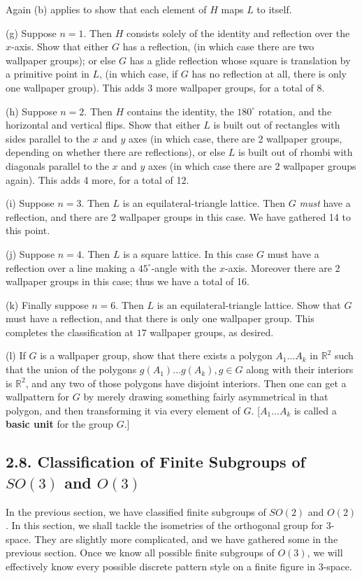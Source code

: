 \documentclass[leqno]{book}
\begin{document}
\begin{enumerate}
Again (b) applies to show that each element of $H$ maps $L$ to itself.

(g) Suppose $n=1$.  Then $H$ consists solely of the identity and reflection over the $x$-axis.  Show that either $G$ has a reflection, (in which case there are two wallpaper groups); or else $G$ has a glide reflection whose square is translation by a primitive point in $L$, (in which case, if $G$ has no reflection at all, there is only one wallpaper group).  This adds 3 more wallpaper groups, for a total of 8.

(h) Suppose $n=2$.  Then $H$ contains the identity, the $180^\circ$ rotation, and the horizontal and vertical flips.  Show that either $L$ is built out of rectangles with sides parallel to the $x$ and $y$ axes (in which case, there are 2 wallpaper groups, depending on whether there are reflections), or else $L$ is built out of rhombi with diagonals parallel to the $x$ and $y$ axes (in which case there are 2 wallpaper groups again).  This adds 4 more, for a total of 12.

(i) Suppose $n=3$.  Then $L$ is an equilateral-triangle lattice.  Then $G$ \emph{must} have a reflection, and there are 2 wallpaper groups in this case.  We have gathered 14 to this point.

(j) Suppose $n=4$.  Then $L$ is a square lattice.  In this case $G$ must have a reflection over a line making a $45^\circ$-angle with the $x$-axis.  Moreover there are 2 wallpaper groups in this case; thus we have a total of 16.

(k) Finally suppose $n=6$.  Then $L$ is an equilateral-triangle lattice.  Show that $G$ must have a reflection, and that there is only one wallpaper group.  This completes the classification at $17$ wallpaper groups, as desired.

(l) If $G$ is a wallpaper group, show that there exists a polygon $A_1\dots A_k$ in $\mathbb R^2$ such that the union of the polygons $g(A_1)\dots g(A_k),g\in G$ along with their interiors is $\mathbb R^2$, and any two of those polygons have disjoint interiors.  Then one can get a wallpattern for $G$ by merely drawing something fairly asymmetrical in that polygon, and then transforming it via every element of $G$.  [$A_1\dots A_k$ is called a \textbf{basic unit} for the group $G$.]
\end{enumerate}

\subsection*{2.8. Classification of Finite Subgroups of $SO(3)$ and $O(3)$}
In the previous section, we have classified finite subgroups of $SO(2)$ and $O(2)$.  In this section, we shall tackle the isometries of the orthogonal group for $3$-space.  They are slightly more complicated, and we have gathered some in the previous section.  Once we know all possible finite subgroups of $O(3)$, we will effectively know every possible discrete pattern style on a finite figure in $3$-space.
\end{document}

